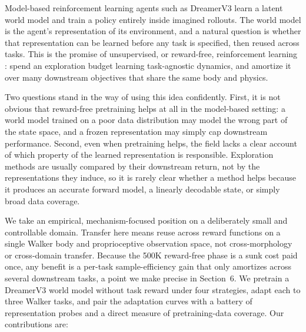\documentclass{article}
\begin{document}
Model-based reinforcement learning agents such as DreamerV3
\citep{hafner2023dreamerv3} learn a latent world model and train a policy
entirely inside imagined rollouts. The world model is the agent's
representation of its environment, and a natural question is whether that
representation can be learned before any task is specified, then reused
across tasks. This is the promise of unsupervised, or reward-free,
reinforcement learning \citep{laskin2021urlb}: spend an exploration budget
learning task-agnostic dynamics, and amortize it over many downstream
objectives that share the same body and physics.

Two questions stand in the way of using this idea confidently. First, it is not
obvious that reward-free pretraining helps at all in the model-based setting: a
world model trained on a poor data distribution may model the wrong part of the
state space, and a frozen representation may simply cap downstream performance.
Second, even when pretraining helps, the field lacks a clear account of
which property of the learned representation is responsible. Exploration
methods are usually compared by their downstream return, not by the
representations they induce, so it is rarely clear whether a method helps
because it produces an accurate forward model, a linearly decodable state, or
simply broad data coverage.

We take an empirical, mechanism-focused position on a deliberately small and
controllable domain. Transfer here means reuse across reward functions on a
single Walker body and proprioceptive observation space, not
cross-morphology or cross-domain transfer. Because the 500K reward-free phase is
a sunk cost paid once, any benefit is a per-task sample-efficiency gain that only
amortizes across several downstream tasks, a point we make precise in
Section~6. We pretrain a DreamerV3 world model without task reward under four
strategies, adapt each to three Walker tasks, and pair the adaptation curves with
a battery of representation probes and a direct measure of pretraining-data
coverage. Our contributions are:
\end{document}
